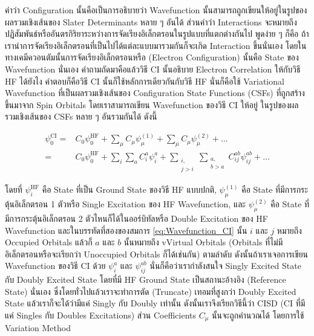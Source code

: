 คำว่า Configuration นั้นคือเป็นการอธิบายว่า Wavefunction นั้นสามารถถูกเขียนให้อยู่ในรูปของผลรวมเชิงเส้นของ Slater Determinants
หลาย ๆ อันได้ ส่วนคำว่า Interactions จะหมายถึงปฏิสัมพันธ์หรืออันตรกิริยาระหว่างการจัดเรียงอิเล็กตรอนในรูปแบบที่แตกต่างกันไป พูดง่าย ๆ ก็คือ%
ถ้าเรานำการจัดเรียงอิเล็กตรอนที่เป็นไปได้แต่ละแบบมารวมกันก็จะเกิด Interaction ขึ้นนั่นเอง โดยในทางเคมีควอนตัมนั้นการจัดเรียงอิเล็กตรอนหรือ
(Electron Configuration) นั้นคือ State ของ Wavefunction นั่นเอง คำถามถัดมาคือแล้ววิธี CI นั้นอธิบาย Electron Correlation
ให้กับวิธี HF ได้ยังไง คำตอบก็คือวิธี CI นั้นก็ใช้หลักการเดียวกันกับวิธี HF นั่นก็คือใช้ Variational Wavefunction ที่เป็นผลรวมเชิงเส้นของ
Configuration State Functions (CSFs) ที่ถูกสร้างขึ้นมาจาก Spin Orbitals โดยเราสามารถเขียน Wavefunction ของวิธี CI ให้อยู่%
ในรูปของผลรวมเชิงเส้นของ CSFs หลาย ๆ อันรวมกันได้ ดังนี้

\begin{equation}
    \label{eq:Wavefunction_CI}
    \begin{aligned}
        \psi_0^{\mathrm{CI}}
        = & C_0 \psi_0^{\mathrm{HF}}
        + \sum_\mu C_\mu \psi_\mu^{(1)}
        + \sum_\mu C_\mu \psi_\mu^{(2) }
        + \ldots                     \\
        = & C_0 \psi_0^{\mathrm{HF}}
        +\sum_i \sum_a C_i^a \psi_i^a
        + \sum_{\substack{i,         \\ j>i}} \sum_{\substack{a, \\ b>a}} C_{i j}^{a b} \psi_{i j}^{a b}
        + \ldots
    \end{aligned}
\end{equation}

\noindent โดยที่ $\psi_i^{\mathrm{HF}}$ คือ State ที่เป็น Ground State ของวิธี HF แบบปกติ, $\psi_\mu^{(1)}$ คือ State
ที่มีการกระตุ้นอิเล็กตรอน 1 ตัวหรือ Single Excitation ของ HF Wavefunction, และ $\psi_\mu^{(2)}$ คือ State ที่มีการกระตุ้นอิเล็กตรอน
2 ตัวไหนก็ได้ในออร์บิทัลหรือ Double Excitation ของ HF Wavefunction และในบรรทัดที่สองของสมการ \ref{eq:Wavefunction_CI} นั้น
$i$ และ $j$ หมายถึง Occupied Orbitals แล้วก็ $a$ และ $b$ นั้นหมายถึง vVirtual Orbitals (Orbitals ที่ไม่มีอิเล็กตรอนหรือจะเรียกว่า
Unoccupied Orbitals ก็ได้เช่นกัน) ตามลำดับ ดังนั้นถ้าเราเจอการเขียน Wavefunction ของวิธี CI ด้วย $\psi_i^a$ และ $\psi_{i j}^{a b}$
นั่นก็คือว่าเรากำลังสนใจ Singly Excited State กับ Doubly Excited State โดยที่มี HF Ground State เป็นสถานะอ้างอิง (Reference
State) นั่นเอง ซึ่งโดยทั่วไปแล้วเราจะทำการตัด (Truncate) เทอมที่สูงกว่า Doubly Excited State แล้วเราก็จะได้ว่ามีแค่ Singly กับ Doubly
เท่านั้น ดังนั้นเราจึงเรียกวิธีนี้ว่า CISD (CI ที่มีแค่ Singles กับ Doubles Excitations) ส่วน Coefficients $C_\mu$ นั้นจะถูกคำนวณได้%
โดยการใช้ Variation Method

